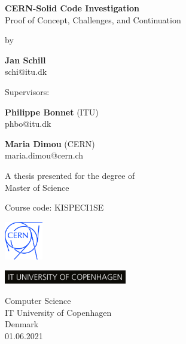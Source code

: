 \begin{titlepage}
   \begin{center}
       \vspace*{1cm}
       \Huge
       \textbf{CERN-Solid Code Investigation}\\
       \LARGE
       \vspace{0.5cm}
        Proof of Concept, Challenges, and Continuation\\
        
       \vspace{1cm}
       
       \normalsize
        by\\
        
       \vspace{1cm}
       
       \Large
       \textbf{Jan Schill}\\
        schi@itu.dk
        
       \vfill
       
       \normalsize
        Supervisors:\\
        
       \vspace{0.3cm}
       
       \textbf{Philippe Bonnet} (ITU)\\
        phbo@itu.dk
        
       \vspace{0.3cm}
       
       \textbf{Maria Dimou} (CERN)\\
        maria.dimou@cern.ch
        
       
       \vspace{1cm}
       
        A thesis presented for the degree of\\
        Master of Science
        
       \vspace{0.5cm}
       
        Course code: KISPECI1SE
        
       \vspace{1cm}
       
       \includegraphics[width=0.125\textwidth]{thesis/latex/assets/cern-logo.jpg}
        
       \vspace{0.5cm}
       
       \includegraphics[width=0.4\textwidth]{thesis/latex/assets/university.jpg}
       
       Computer Science\\
       IT University of Copenhagen\\
       Denmark\\
       01.06.2021
            
   \end{center}
\end{titlepage}

